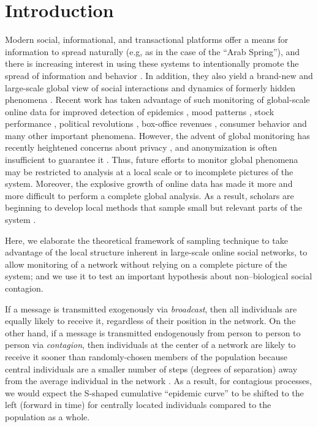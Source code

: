 \section*{Introduction}
Modern social, informational, and transactional platforms offer a means for information to spread naturally (e.g, as in the case of the ``Arab Spring''\cite{1}), and there is increasing interest in using these systems to intentionally promote the spread of information and behavior \cite{2,3,4,5}.  In addition, they also yield a brand-new and large-scale global view of social interactions and dynamics of formerly hidden phenomena \cite{6}.  Recent work has taken advantage of such monitoring of global-scale online data for improved detection of epidemics \cite{7,8,9,10}, mood patterns \cite{11,12}, stock performance \cite{13}, political revolutions \cite{14}, box-office revenues \cite{15}, consumer behavior \cite{9,16} and many other important phenomena. However, the advent of global monitoring has recently heightened concerns about privacy \cite{17}, and anonymization is often insufficient to guarantee it \cite{18}.  Thus, future efforts to monitor global phenomena may be restricted to analysis at a local scale \cite{10,19} or to incomplete pictures of the system.  Moreover, the explosive growth of online data has made it more and more difficult to perform a complete global analysis.  As a result, scholars are beginning to develop local methods that sample small but relevant parts of the system \cite{20,21}.

Here, we elaborate the theoretical framework of \cite{22} sampling technique to take advantage of the local structure inherent in large-scale online social networks, to allow monitoring of a network without relying on a complete picture of the system; and we use it to test an important hypothesis about non--biological social contagion. 

If a message is transmitted exogenously via {\it broadcast}, then all individuals are equally likely to receive it, regardless of their position in the network. On the other hand, if a message is transmitted endogenously from person to person to person via {\it contagion}, then individuals at the center of a network are likely to receive it sooner than randomly-chosen members of the population because central individuals are a smaller number of steps (degrees of separation) away from the average individual in the network \cite{22,23}. As a result, for contagious processes, we would expect the S-shaped cumulative ``epidemic curve'' \cite{24} to be shifted to the left (forward in time) for centrally located individuals compared to the population as a whole.

